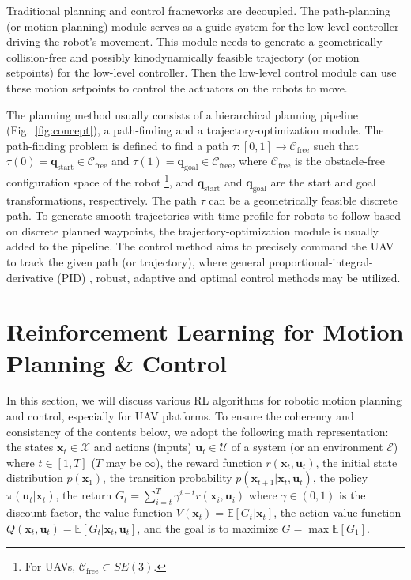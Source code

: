 \documentclass{article}
\newcommand{\B}[1]{\mathbf{#1}}
\newcommand{\robotConfig}{\mathcal{C}}
\begin{document}
Traditional planning and control frameworks are decoupled.
The path-planning (or motion-planning) module serves as a guide system 
for the low-level controller driving the robot's movement. 
This module needs to generate a geometrically 
collision-free and possibly kinodynamically feasible trajectory 
(or motion setpoints) for the low-level controller.
Then the low-level control module can use these motion 
setpoints to control the actuators on the robots to move.

The planning method usually consists of a hierarchical 
planning pipeline (Fig.~\ref{fig:concept}), a path-finding
and a trajectory-optimization module.
The path-finding problem is defined to 
find a path 
$
\tau : \left[0,1\right]\rightarrow \robotConfig_{\text{free}} 
$
such that  
$\tau(0) = \B{q}_{\text{start}} \in \robotConfig_{\text{free}}$ 
and
$\tau(1) = \B{q}_{\text{goal}} \in \robotConfig_{\text{free}}$, 
where $\robotConfig_\text{free}$ is the obstacle-free configuration space of the robot
\footnote{For UAVs, $\robotConfig_\text{free} \subset SE(3)$.}, 
and $\B{q}_{\text{start}}$ and $\B{q}_{\text{goal}}$ are the start and goal transformations, respectively.
The path $\tau$ can be a geometrically feasible discrete path.
To generate smooth trajectories with time profile 
for robots to 
follow based on discrete planned waypoints, the 
trajectory-optimization module is usually added to 
the pipeline. 
The control method aims to precisely command the 
UAV to track the given path (or trajectory), where 
general proportional-integral-derivative (PID) , 
robust, adaptive and optimal control methods may be utilized.


\section{Reinforcement Learning for Motion Planning \& Control}

In this section, we will discuss various RL algorithms for robotic 
motion planning and control, especially for UAV platforms. 
To ensure the coherency and consistency of the contents below, 
we adopt the following math representation: the states 
$\B{x}_t \in \boldsymbol{\mathcal{X}}$ 
and actions (inputs) $\B{u}_t \in \boldsymbol{\mathcal{U}}$ of a system (or an environment $\boldsymbol{\mathcal{E}}$) where $t\in\left[1,T\right]$ ($T$ may be $\infty$), 
the reward function $r(\B{x}_t, \B{u}_t)$, 
the initial state distribution $p(\B{x}_1)$, 
the transition probability $p(\B{x}_{t+1} | \B{x}_t, \B{u}_t)$, 
the policy $\pi(\B{u}_t | \B{x}_t)$, 
the return $G_t = \sum_{i=t}^T\gamma^{i-t}r(\B{x}_i, \B{u}_i)$ where $\gamma \in \left(0,1\right)$ is the discount factor, 
the value function $V(\B{x}_t) = \mathbb{E}\left[G_t | \B{x}_t\right]$, 
the action-value function $Q(\B{x}_t, \B{u}_t) = \mathbb{E}\left[G_t | \B{x}_t, \B{u}_t\right]$, 
and the goal is to maximize $G = \max \mathbb{E}\left[G_1 \right]$.
\end{document}
